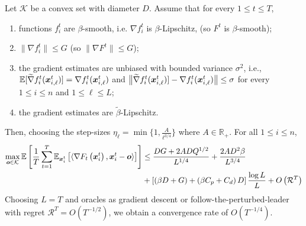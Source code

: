 \begin{theorem}
\label{thm:stoc:version2}
Let $\mathcal{K}$ be a convex set with diameter $D$. Assume that for every $1 \leq t \leq T$, 
\begin{enumerate}
	\item functions $f^{t}_{i}$ are $\beta$-smooth, i.e. $\nabla f^{t}_{i}$ is $\beta$-Lipschitz,  (so $F^{t}$ is $\beta$-smooth);
	\item $\| \nabla f^{t}_{i}\| \leq G$ (so $\| \nabla F^{t}\| \leq G$);
	\item the gradient estimates are unbiased with bounded variance $\sigma^{2}$, i.e., 
		$\mathbb{E} [\widetilde{\nabla} f^{t}_{i}(\bm{x}^{t}_{i,\ell})] = \nabla f^{t}_{i}(\bm{x}^{t}_{i,\ell})$
		and $\bigl \| \widetilde{\nabla} f^{t}_{i}(\bm{x}^{t}_{i,\ell})] - \nabla f^{t}_{i}(\bm{x}^{t}_{i,\ell}) \bigr \| \leq \sigma$
		for every $1 \leq i \leq n$ and $1 \leq \ell \leq L$;
	\item the gradient estimates are $\widetilde{\beta}$-Lipschitz.
\end{enumerate}
Then, choosing the step-sizes $\eta_\ell = \min \{1, \frac{A}{\ell^{3/4}}\}$ where $A \in \mathbb{R}_+$. For all $1 \leq i \leq n$, 
\begin{align*}
    \max_{\bm{o} \in \mathcal{K}} \mathbb{E} \left[ \frac{1}{T} \sum_{t=1}^T \mathbb{E}_{\bm{x}_i^t}\left[ \langle \nabla F_t\left( \bm{x}_i^t \right), \bm{x}_i^t - \bm{o} \rangle \right] \right]
    &\leq \frac{DG + 2ADQ^{1/2}}{L^{1/4}} + \frac{2AD^2\beta}{L^{3/4}} \\
    &+\left[ \left(\beta D + G\right) + \left(\beta C_p + C_d\right)D \right]  \frac{\log L }{L} + O \left(\mathcal{R}^T \right)
\end{align*}
Choosing $L=T$ and oracles as gradient descent or follow-the-perturbed-leader with regret $\mathcal{R}^T =
O\left(T^{-1/2}\right)$, we obtain a convergence rate of $O\left( T^{-1/4} \right).$

\end{theorem}


